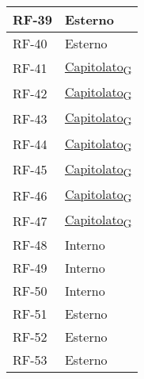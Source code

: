 \begin{longtable}{|>{\centering\arraybackslash}m{}|>{\centering\arraybackslash}m{}|}
	RF-39           & Esterno                                                                                                           \\\hline
	RF-40           & Esterno                                                                                                           \\\hline
	RF-41           & \href{https://7last.github.io/docs/pb/documentazione-interna/glossario\#capitolato}{Capitolato\textsubscript{G}} \\\hline
	RF-42           & \href{https://7last.github.io/docs/pb/documentazione-interna/glossario\#capitolato}{Capitolato\textsubscript{G}} \\\hline
	RF-43           & \href{https://7last.github.io/docs/pb/documentazione-interna/glossario\#capitolato}{Capitolato\textsubscript{G}} \\\hline
	RF-44           & \href{https://7last.github.io/docs/pb/documentazione-interna/glossario\#capitolato}{Capitolato\textsubscript{G}} \\\hline
	RF-45           & \href{https://7last.github.io/docs/pb/documentazione-interna/glossario\#capitolato}{Capitolato\textsubscript{G}} \\\hline
	RF-46           & \href{https://7last.github.io/docs/pb/documentazione-interna/glossario\#capitolato}{Capitolato\textsubscript{G}} \\\hline
	RF-47           & \href{https://7last.github.io/docs/pb/documentazione-interna/glossario\#capitolato}{Capitolato\textsubscript{G}} \\\hline
	RF-48           & Interno                                                                                                           \\\hline
	RF-49           & Interno                                                                                                           \\\hline
	RF-50           & Interno                                                                                                           \\\hline
	RF-51           & Esterno                                                                                                           \\\hline
	RF-52           & Esterno                                                                                                           \\\hline
	RF-53           & Esterno                                                                                                           \\\hline

\end{longtable}
